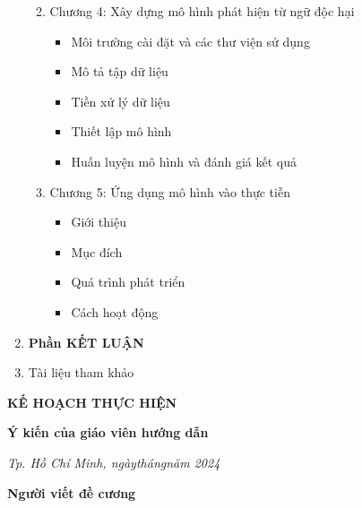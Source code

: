 \begin{enumerate}[label=\textbf{\arabic*.}]
\begin{enumerate}
\begin{itemize}
                    \end{itemize}
              \item Chương 4: Xây dựng mô hình phát hiện từ ngữ độc hại
                    \begin{itemize}
                        \item Môi trường cài đặt và các thư viện sử dụng
                        \item Mô tả tập dữ liệu
                        \item Tiền xử lý dữ liệu
                        \item Thiết lập mô hình
                        \item Huấn luyện mô hình và đánh giá kết quả
                    \end{itemize}
              \item Chương 5: Ứng dụng mô hình vào thực tiễn
                    \begin{itemize}
                        \item Giới thiệu
                        \item Mục đích
                        \item Quá trình phát triển
                        \item Cách hoạt động
                    \end{itemize}
          \end{enumerate}
    \item \textbf{Phần KẾT LUẬN}
    \item Tài liệu tham khảo
\end{enumerate}

\newpage
\textbf{KẾ HOẠCH THỰC HIỆN}


\noindent\begin{minipage}[t]{0.42\textwidth}
    \centering
    \textbf{Ý kiến của giáo viên hướng dẫn}
\end{minipage}\hfil
\begin{minipage}[t]{0.57\textwidth}
    \centering
    \textit{Tp. Hồ Chí Minh, ngày\qquad tháng\qquad năm 2024}

    \textbf{Người viết đề cương}
\end{minipage}
\restoregeometry